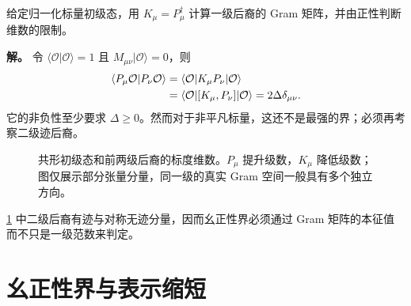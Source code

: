 \begin{example}
给定归一化标量初级态，用 $K_\mu=P_\mu^\dagger$ 计算一级后裔的 Gram 矩阵，并由正性判断维数的限制。

\textbf{解。} 令 $\langle\mathcal O|\mathcal O\rangle=1$ 且 $M_{\mu\nu}|\mathcal O\rangle=0$，则
\begin{align}\label{eq:ghs-scalar-level-one-gram}
 \langle P_\mu\mathcal O|P_\nu\mathcal O\rangle
 &=\langle\mathcal O|K_\mu P_\nu|\mathcal O\rangle\\
 &=\langle\mathcal O|[K_\mu,P_\nu]|\mathcal O\rangle
 =2\Delta\delta_{\mu\nu}.\notag
\end{align}
它的非负性至少要求 $\Delta\ge0$。然而对于非平凡标量，这还不是最强的界；必须再考察二级迹后裔。
\end{example}

\begin{figure}[htbp]
\centering

\caption{共形初级态和前两级后裔的标度维数。$P_\mu$ 提升级数，$K_\mu$ 降低级数；图仅展示部分张量分量，同一级的真实 Gram 空间一般具有多个独立方向。}\label{fig:ghs-descendant-weight-levels}
\end{figure}

\cref{fig:ghs-descendant-weight-levels} 中二级后裔有迹与对称无迹分量，因而幺正性界必须通过 Gram 矩阵的本征值而不只是一级范数来判定。

\section{幺正性界与表示缩短}

